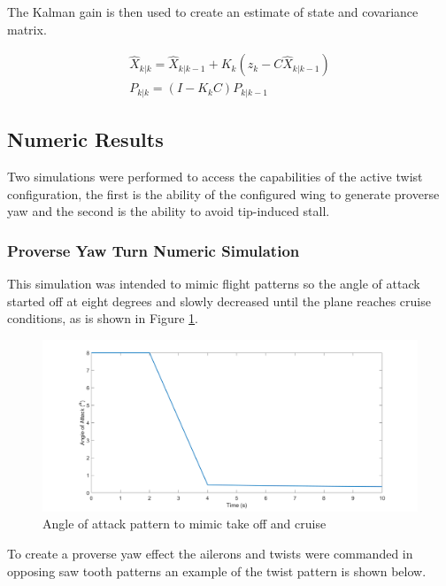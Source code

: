 \documentclass[11pt]{ucthesis}
\begin{document}
The Kalman gain is then used to create an estimate of state and covariance matrix.

\begin{equation}
\begin{matrix}
\hat{X}_{k\vert k} = \hat{X}_{k\vert k-1} + K_k(z_k-C\hat{X}_{k\vert k-1} )\\
P_{k\vert k} = (I-K_kC)P_{k\vert k-1}
\end{matrix}
\end{equation}

\subsection{Numeric Results}
Two simulations were performed to access the capabilities of the active twist configuration, the first is the ability of the configured wing to generate proverse yaw and the second is the ability to avoid tip-induced stall.

\subsubsection{Proverse Yaw Turn Numeric Simulation}
This simulation was intended to mimic flight patterns so the angle of attack started off at eight degrees and slowly decreased until the plane reaches cruise conditions, as is shown in Figure \ref{fig:AOAPat}.

\begin{figure}[thpb]
\centering
\includegraphics[width=1\linewidth]{Figures/ProverseYawAoA.png}
\caption{Angle of attack pattern to mimic take off and cruise}
\label{fig:AOAPat}
\end{figure}

To create a proverse yaw effect the ailerons and twists were commanded in opposing saw tooth patterns an example of the twist pattern is shown below. 
\end{document}
